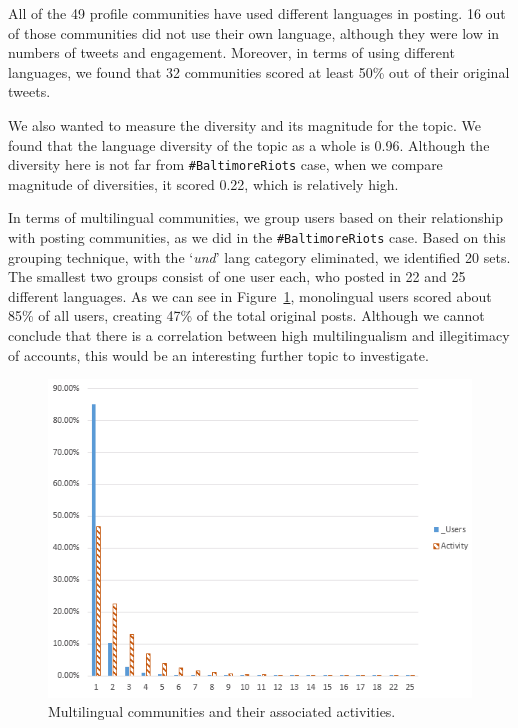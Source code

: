 \documentclass{llncs}
\begin{document}
{All of the 49 profile communities have used different languages in
posting. 16 out of those communities did not use their own language,
although they were low in numbers of tweets and engagement. Moreover,
in terms of using different languages, we found that 32 communities
scored at least 50\% out of their original tweets.

We also wanted to measure the diversity and its magnitude for the
topic.  We found that the language diversity of the topic as a whole
is 0.96. Although the diversity here is not far from
{\texttt{\#BaltimoreRiots}} case, when we compare magnitude of
diversities, it scored 0.22, which is relatively high.

In terms of multilingual communities, we group users based on their
relationship with posting communities, as we did in the
{\texttt{\#BaltimoreRiots}} case.  Based on this grouping technique,
with the `{\emph{und}}' lang category eliminated, we identified 20
sets. The smallest two groups consist of one user each, who posted in
22 and 25 different languages.  As we can see in
Figure~\ref{fig:multilingual}, monolingual users scored about 85\% of
all users, creating 47\% of the total original posts. Although we
cannot conclude that there is a correlation between high
multilingualism and illegitimacy of accounts, this would be an
interesting further topic to investigate.

\begin{figure}[htb]
\centering
\includegraphics[width=\columnwidth]{images/multilingualcommunities.png}
\caption{Multilingual communities and their associated activities.}
\label{fig:multilingual}
\end{figure}


}
\end{document}
